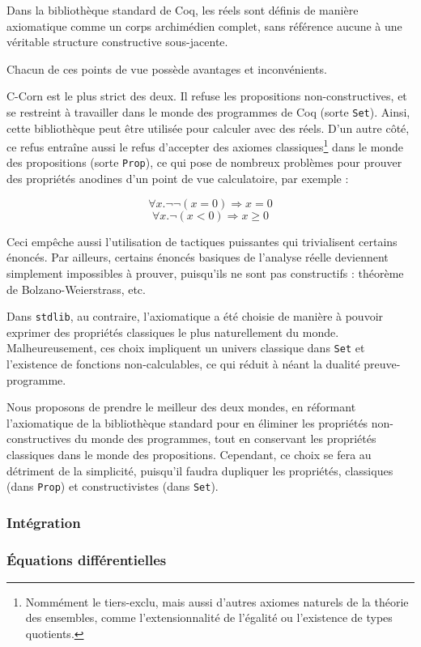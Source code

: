 \documentclass[11pt]{article}
\begin{document}
Dans la bibliothèque standard de Coq, les réels sont définis de manière axiomatique comme un corps archimédien complet, sans référence aucune à une véritable structure constructive sous-jacente.

Chacun de ces points de vue possède avantages et inconvénients.

C-Corn est le plus strict des deux. Il refuse les propositions non-constructives, et se restreint à travailler dans le monde des programmes de Coq (sorte \texttt{Set}). Ainsi, cette bibliothèque peut être utilisée pour calculer avec des réels. D'un autre côté, ce refus entraîne aussi le refus d'accepter des axiomes classiques\footnote{Nommément le tiers-exclu, mais aussi d'autres axiomes naturels de la théorie des ensembles, comme l'extensionnalité de l'égalité ou l'existence de types quotients.} dans le monde des propositions (sorte \texttt{Prop}), ce qui pose de nombreux problèmes pour prouver des propriétés anodines d'un point de vue calculatoire, par exemple :

$$\forall x.\neg\neg(x = 0) \Rightarrow x = 0$$
$$\forall x.\neg(x < 0) \Rightarrow x \geq 0$$

Ceci empêche aussi l'utilisation de tactiques puissantes qui trivialisent certains énoncés. Par ailleurs, certains énoncés basiques de l'analyse réelle deviennent simplement impossibles à prouver, puisqu'ils ne sont pas constructifs : théorème de Bolzano-Weierstrass, etc.

Dans \texttt{stdlib}, au contraire, l'axiomatique a été choisie de manière à pouvoir exprimer des propriétés classiques le plus naturellement du monde. Malheureusement, ces choix impliquent un univers classique dans \texttt{Set} et l'existence de fonctions non-calculables, ce qui réduit à néant la dualité preuve-programme.

\bigskip
Nous proposons de prendre le meilleur des deux mondes, en réformant l'axiomatique de la bibliothèque standard pour en éliminer les propriétés non-constructives du monde des programmes, tout en conservant les propriétés classiques dans le monde des propositions. Cependant, ce choix se fera au détriment de la simplicité, puisqu'il faudra dupliquer les propriétés, classiques (dans \texttt{Prop}) et constructivistes (dans \texttt{Set}).

\subsubsection{Intégration}

\subsubsection{Équations différentielles}
\end{document}
